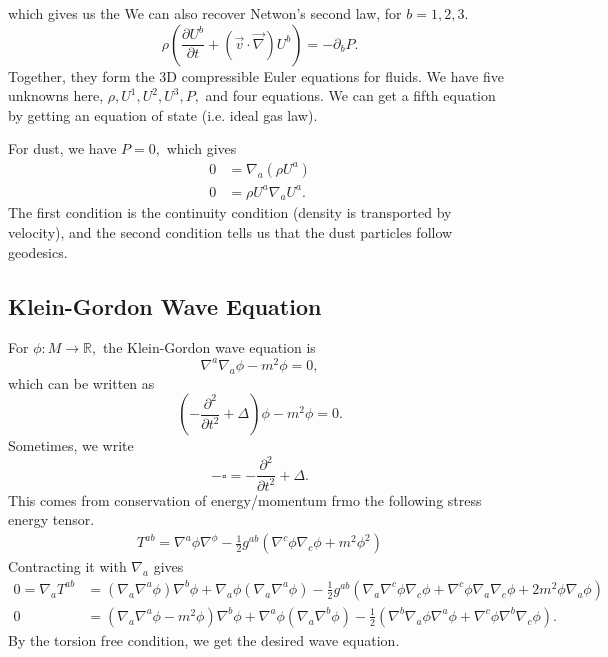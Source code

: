 \documentclass{article}
\numberwithin{equation}{section}
\begin{document}
which gives us the  We can also recover Netwon's second law, for $b=1,2,3.$
\begin{equation*}
    \rho\left(\frac{\partial U^b}{\partial t} + (\vec{v}\cdot \vec{\nabla})U^b\right) = -\partial_b P.
\end{equation*}
Together, they form the 3D compressible Euler equations for fluids. We have five unknowns here, $\rho, U^1,U^2,U^3,P,$ and four equations. We can get a fifth equation by getting an equation of state (i.e. ideal gas law). 
\begin{idea}
    For dust, we have $P=0,$ which gives
    \begin{align*}
        0 &= \nabla_a(\rho U^a) \\ 
        0 &= \rho U^a \nabla_a U^a.
    \end{align*}
    The first condition is the continuity condition (density is transported by velocity), and the second condition tells us that the dust particles follow geodesics.
\end{idea}
\subsection{Klein-Gordon Wave Equation}
For $\phi: M\to \mathbb{R},$ the Klein-Gordon wave equation is 
\begin{equation*}
    \nabla^a\nabla_a \phi - m^2\phi = 0,
\end{equation*}
which can be written as 
\begin{equation*}
    \left(-\frac{\partial^2}{\partial t^2} + \Delta\right)\phi - m^2\phi = 0.
\end{equation*}
Sometimes, we write 
\begin{equation*}
    -\square = -\frac{\partial^2}{\partial t^2} + \Delta.
\end{equation*}
This comes from conservation of energy/momentum frmo the following stress energy tensor.
\begin{align*}
    T^{ab} = \nabla^a\phi \nabla^\phi - \frac{1}{2}g^{ab}\left(\nabla^c\phi \nabla_c\phi + m^2\phi^2\right)
\end{align*}
Contracting it with $\nabla_a$ gives 
\begin{align*}
    0 = \nabla_a T^{ab} &= (\nabla_a\nabla^a\phi)\nabla^b\phi + \nabla_a\phi(\nabla_a\nabla^a\phi) - \frac{1}{2}g^{ab}\left(\nabla_a\nabla^c \phi \nabla_c \phi + \nabla^c \phi \nabla_a\nabla_c \phi + 2m^2\phi \nabla_a\phi\right) \\ 
    0 &= (\nabla_a\nabla^a \phi - m^2\phi)\nabla^b\phi + \nabla^a\phi (\nabla_a\nabla^b\phi) - \frac{1}{2}\left(\nabla^b\nabla_a\phi\nabla^a\phi + \nabla^c\phi\nabla^b\nabla_c\phi\right).
\end{align*}
By the torsion free condition, we get the desired wave equation.
\end{document}
